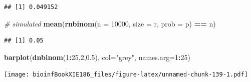 \documentclass[]{book}
\makeatletter
\newenvironment{Shaded}{\begin{snugshade}}{\end{snugshade}}
\newcommand{\CommentTok}[1]{\textcolor[rgb]{0.56,0.35,0.01}{\textit{#1}}}
\newcommand{\DataTypeTok}[1]{\textcolor[rgb]{0.13,0.29,0.53}{#1}}
\newcommand{\DecValTok}[1]{\textcolor[rgb]{0.00,0.00,0.81}{#1}}
\newcommand{\FloatTok}[1]{\textcolor[rgb]{0.00,0.00,0.81}{#1}}
\newcommand{\KeywordTok}[1]{\textcolor[rgb]{0.13,0.29,0.53}{\textbf{#1}}}
\newcommand{\NormalTok}[1]{#1}
\newcommand{\OperatorTok}[1]{\textcolor[rgb]{0.81,0.36,0.00}{\textbf{#1}}}
\newcommand{\StringTok}[1]{\textcolor[rgb]{0.31,0.60,0.02}{#1}}
\newenvironment{kframe}{%
\medskip{}
\setlength{\fboxsep}{.8em}
 \def\at@end@of@kframe{}%
 \ifinner\ifhmode%
  \def\at@end@of@kframe{\end{minipage}}%
  \begin{minipage}{\columnwidth}%
 \fi\fi%
 \def\FrameCommand##1{\hskip\@totalleftmargin \hskip-\fboxsep
 \colorbox{shadecolor}{##1}\hskip-\fboxsep
     \hskip-\linewidth \hskip-\@totalleftmargin \hskip\columnwidth}%
 \MakeFramed {\advance\hsize-\width
   \@totalleftmargin\z@ \linewidth\hsize
   \@setminipage}}%
 {\par\unskip\endMakeFramed%
 \at@end@of@kframe}
\renewenvironment{Shaded}{\begin{kframe}}{\end{kframe}}
\makeatother
\begin{document}
\begin{verbatim}
## [1] 0.049152
\end{verbatim}

\begin{Shaded}
\begin{Highlighting}[]
\CommentTok{# simulated}
\KeywordTok{mean}\NormalTok{(}\KeywordTok{rnbinom}\NormalTok{(}\DataTypeTok{n =} \DecValTok{10000}\NormalTok{, }\DataTypeTok{size =}\NormalTok{ r, }\DataTypeTok{prob =}\NormalTok{ p) }\OperatorTok{==}\StringTok{ }\NormalTok{n)}
\end{Highlighting}
\end{Shaded}

\begin{verbatim}
## [1] 0.05
\end{verbatim}

\begin{Shaded}
\begin{Highlighting}[]
\KeywordTok{barplot}\NormalTok{(}\KeywordTok{dnbinom}\NormalTok{(}\DecValTok{1}\OperatorTok{:}\DecValTok{25}\NormalTok{,}\DecValTok{2}\NormalTok{,}\FloatTok{0.5}\NormalTok{), }\DataTypeTok{col=}\StringTok{"grey"}\NormalTok{, }\DataTypeTok{names.arg=}\DecValTok{1}\OperatorTok{:}\DecValTok{25}\NormalTok{)}
\end{Highlighting}
\end{Shaded}

\texttt{[image: bioinfBookXIE186\_files/figure-latex/unnamed-chunk-139-1.pdf]}
\end{document}
